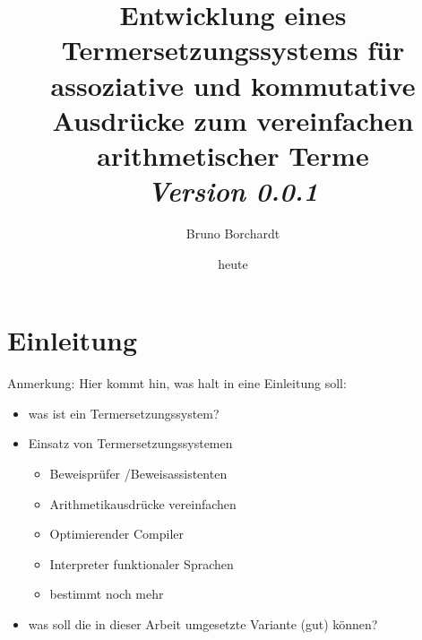 \documentclass{article}
\title{Entwicklung eines Termersetzungssystems für assoziative und kommutative Ausdrücke zum vereinfachen arithmetischer Terme\\ \textit{Version 0.0.1}}
\author{Bruno Borchardt}
\date{heute}
\begin{document}
\maketitle

\tableofcontents

\clearpage

\section{Einleitung}
\begin{itshape}
Anmerkung: Hier kommt hin, was halt in eine Einleitung soll:
\begin{itemize}
    \item was ist ein Termersetzungssystem?
    \item Einsatz von Termersetzungssystemen
    \begin{itemize}
        \item Beweisprüfer /Beweisassistenten
        \item Arithmetikausdrücke vereinfachen
        \item Optimierender Compiler
	\item Interpreter funktionaler Sprachen
        \item bestimmt noch mehr
    \end{itemize}
    \item was soll die in dieser Arbeit umgesetzte Variante (gut) können?
\end{itemize}
\end{itshape}
\end{document}
